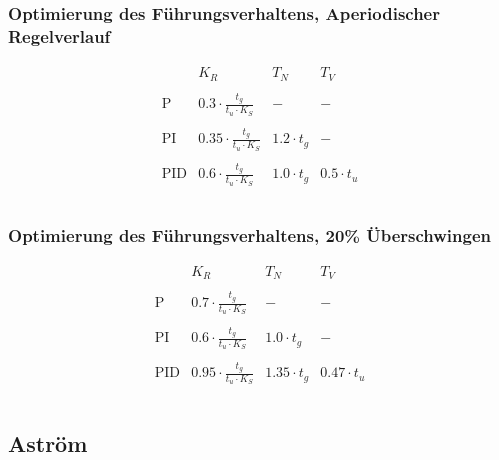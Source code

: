 \subsubsection{Optimierung des Führungsverhaltens, Aperiodischer Regelverlauf}
\begin{table}[h!]
    \[
        \begin{array}{lccc}
            &
                K_R &
                T_N &
                T_V \\\\
            \text{P} &
                0.3 \cdot \frac{t_g}{t_u \cdot K_S} &
                - &
                - \\\\
            \text{PI} &
                0.35 \cdot \frac{t_g}{t_u \cdot K_S} &
                1.2 \cdot t_g &
                - \\\\
            \text{PID} &
                0.6 \cdot \frac{t_g}{t_u \cdot K_S} &
                1.0 \cdot t_g &
                0.5 \cdot t_u \\\\
        \end{array}
    \]
\end{table}

\subsubsection{Optimierung des Führungsverhaltens, 20\% Überschwingen}
\begin{table}[h!]
    \[
        \begin{array}{lccc}
            &
                K_R &
                T_N &
                T_V \\\\
            \text{P} &
                0.7 \cdot \frac{t_g}{t_u \cdot K_S} &
                - &
                - \\\\
            \text{PI} &
                0.6 \cdot \frac{t_g}{t_u \cdot K_S} &
                1.0 \cdot t_g &
                - \\\\
            \text{PID} &
                0.95 \cdot \frac{t_g}{t_u \cdot K_S} &
                1.35 \cdot t_g &
                0.47 \cdot t_u \\\\
        \end{array}
    \]
\end{table}

\subsection{Aström}


